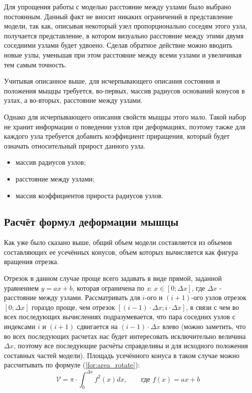 Для упрощения работы с моделью расстояние между узлами было выбрано постоянным. Данный факт не вносит никаких ограничений в представление модели, так как, описывая некоторый узел пропорционально соседям этого узла, получается представление, в котором визуально расстояние между этими двумя соседними узлами будет удвоено. Сделав обратное действие можно вводить новые узлы, уменьшая при этом расстояние между всеми узлами и увеличивая тем самым точность.

Учитывая описанное выше, для исчерпывающего описания состояния и положения мыщцы требуется, во-первых, массив радиусов оснований конусов в узлах, а во-вторых, расстояние между узлами.

Однако для исчерпывающего описания свойств мыщцы этого мало. Такой набор не хранит информации о поведении узлов при деформациях, поэтому также для каждого узла требуется добавить коэффициент приращения, который будет означать относительный прирост данного узла.
\begin{itemize}
    \item массив радиусов узлов;
    \item расстояние между узлами;
    \item массив коэффициентов прироста радиусов узлов.
\end{itemize}

\subsection{Расчёт формул деформации мышцы}

Как уже было сказано выше, общий объем модели составляется из объемов составляющих ее усечённых конусов, объем которых вычисляется как фигура вращения отрезка. 

Отрезок в данном случае проще всего задавать в виде прямой, заданной уравнением $ y = ax + b $, которая ограничена по \textit{x}: $x \in [0; \Delta x]$, где $\Delta x$ - расстояние между узлами. Рассматривать для $i$-ого и $(i + 1)$-ого узлов отрезок $[0; \Delta x]$ гораздо проще, чем отрезок $[(i - 1) \cdot \Delta x; i \cdot \Delta x]$, в связи с чем во всех последующих вычислениях подразумевается, что пара соседних узлов с индексами $i$ и $(i + 1)$ сдвигается на $(i - 1) \cdot \Delta x$ влево (можно заметить, что во всех последующих расчетах нас будет интересовать исключительно величина $\Delta x$, поэтому все последующие расчёты справделивы и для исходного положения составных частей модели). Площадь усечённого конуса в таком случае можно рассчитывать по формуле (\ref{for:area_rotate}):
\begin{equation}
    \label{for:area_rotate}
    \mathcal{V} = \pi \cdot \int_{0}^{\Delta x}f^2(x)dx,\qquad \text{где }f(x) = ax + b
\end{equation}

